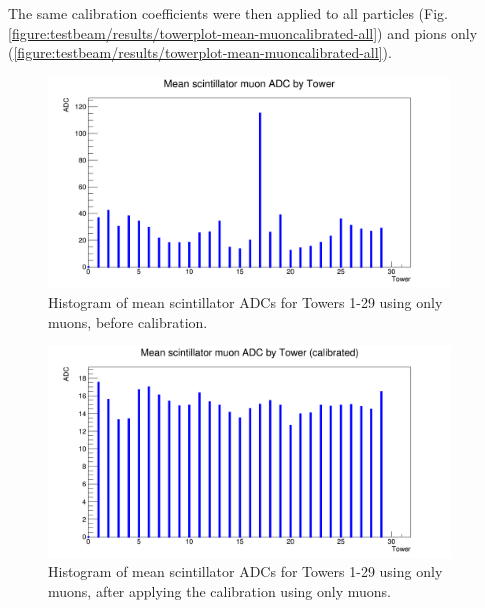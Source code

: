 The same calibration coefficients were then applied to all particles (Fig. \ref{figure:testbeam/results/towerplot-mean-muoncalibrated-all}) and pions only (\ref{figure:testbeam/results/towerplot-mean-muoncalibrated-all}). 

\begin{figure}[h]
	\centering
	\includegraphics[width=0.95\textwidth]{../Pictures/IDEA/Calibration/new-towerplot-muon-uncal.png}
	\caption{Histogram of mean scintillator \acrshort{ADC}s for Towers 1-29 using only muons, before calibration.}
	\label{figure:testbeam/results/towerplot-mean-uncalibrated-muons}
\end{figure}

\begin{figure}[h]
	\centering
	\includegraphics[width=0.95\textwidth]{../Pictures/IDEA/Calibration/towerplot-scintillator-mean-muoncalibrated-muons.png}
	\caption{Histogram of mean scintillator \acrshort{ADC}s for Towers 1-29 using only muons, after applying the calibration using only muons.}
	\label{figure:testbeam/results/towerplot-mean-muoncalibrated-muons}
\end{figure}

